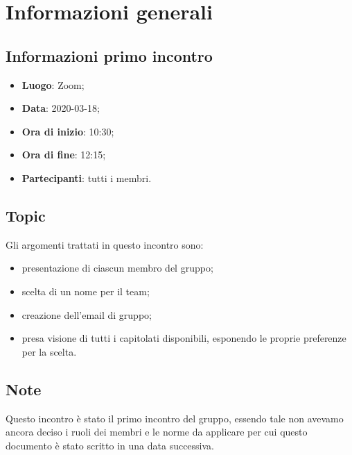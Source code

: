 \section{Informazioni generali}
\subsection{Informazioni primo incontro}
\begin{itemize}
\item \textbf{Luogo}: Zoom\glo;
\item \textbf{Data}: 2020-03-18;
\item \textbf{Ora di inizio}: 10:30;
\item \textbf{Ora di fine}: 12:15;
\item \textbf{Partecipanti}: tutti i membri.
\end{itemize}

\subsection{Topic}
Gli argomenti trattati in questo incontro sono:
\begin{itemize}
	\item presentazione di ciascun membro del gruppo;
	\item scelta di un nome per il team;
	\item creazione dell'email di gruppo;
	\item presa visione di tutti i capitolati disponibili, esponendo le proprie preferenze per la scelta.
\end{itemize}

\subsection{Note}
Questo incontro è stato il primo incontro del gruppo, essendo tale non avevamo ancora deciso i ruoli dei membri e le norme da applicare per cui questo documento è stato scritto in una data successiva.